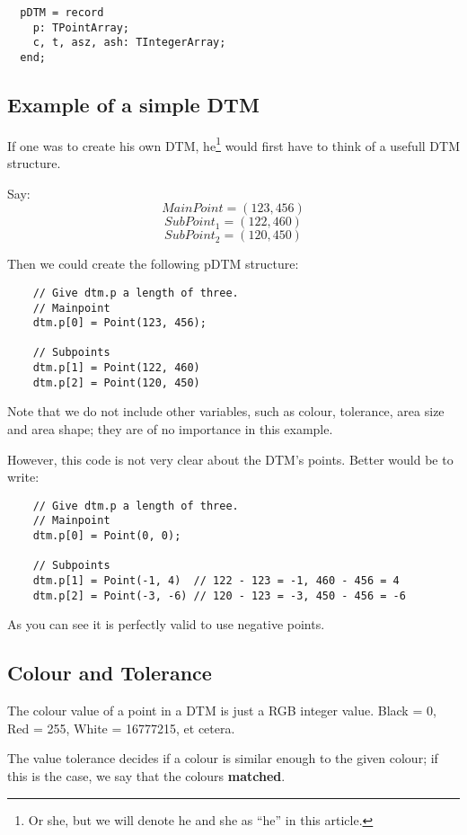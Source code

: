 \documentclass[a4paper, 10pt]{report} %
\begin{document}
\begin{verbatim}
  pDTM = record
    p: TPointArray;
    c, t, asz, ash: TIntegerArray;
  end; 
\end{verbatim}

\subsection{Example of a simple DTM}
If one was to create his own DTM, he\footnote{Or she, but we will denote he
and she as ``he'' in this article.} would first have to think of a usefull DTM
structure.

Say:
$$ MainPoint = (123, 456)  $$
$$ SubPoint_1 = (122, 460) $$
$$ SubPoint_2 = (120, 450) $$

Then we could create the following pDTM structure:

\begin{verbatim}
	// Give dtm.p a length of three.
	// Mainpoint
	dtm.p[0] = Point(123, 456);

	// Subpoints
	dtm.p[1] = Point(122, 460)
	dtm.p[2] = Point(120, 450)
\end{verbatim}

Note that we do not include other variables, such as colour, tolerance, area
size and area shape; they are of no importance in this example.

However, this code is not very clear about the DTM's points.
Better would be to write:

\begin{verbatim}
    // Give dtm.p a length of three.
    // Mainpoint
    dtm.p[0] = Point(0, 0);

    // Subpoints
    dtm.p[1] = Point(-1, 4)  // 122 - 123 = -1, 460 - 456 = 4
    dtm.p[2] = Point(-3, -6) // 120 - 123 = -3, 450 - 456 = -6
\end{verbatim}

As you can see it is perfectly valid to use negative points.

\subsection{Colour and Tolerance}

The colour value of a point in a DTM is just a RGB integer value.
Black = 0, Red = 255, White = 16777215, et cetera.

The value tolerance decides if a colour is similar enough to the given
colour; if this is the case, we say that the colours \textbf{matched}.
\end{document}
